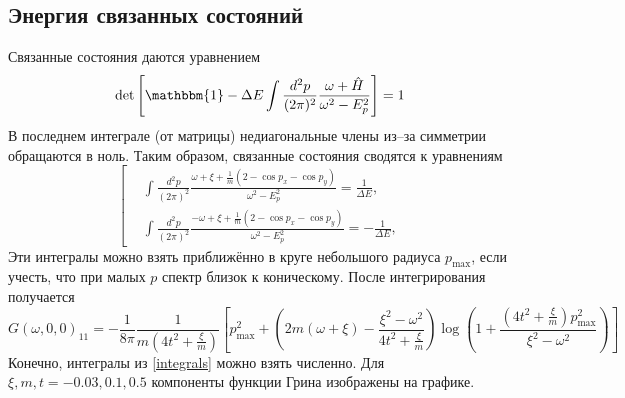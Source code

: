\subsection{Энергия связанных состояний}
Связанные состояния даются уравнением
\begin{equation}    
    \det{\left[\mathbbm{1} - \Delta E \int \frac{d^2 p}{(2\pi)^2} 
            \frac{\omega + \hat{H}}{\omega^2 - E_p^2}\right]} = 1
\end{equation}
В последнем интеграле (от матрицы) недиагональные члены из--за симметрии обращаются в ноль.
Таким образом, связанные состояния сводятся к уравнениям
\begin{equation}
    \label{integrals}
    \left[
    \begin{split}
        &\int \frac{d^2 p}{(2\pi)^2} 
            \frac{\omega + \xi + \frac{1}{m}(2 - \cos{p_x} - \cos{p_y})}
                 {\omega^2 - E_p^2} = \frac{1}{\Delta E},\\
        &\int \frac{d^2 p}{(2\pi)^2} 
            \frac{-\omega + \xi + \frac{1}{m}(2 - \cos{p_x} - \cos{p_y})}
                 {\omega^2 - E_p^2} = -\frac{1}{\Delta E},
    \end{split}
    \right.
\end{equation}
Эти интегралы можно взять приближённо в круге небольшого радиуса $p_{\mathrm{max}}$,
если учесть, что при малых $p$ спектр близок к 
коническому. После интегрирования получается
\begin{equation}
    G(\omega,0,0)_{11} = -\frac{1}{8\pi}\frac{1}{m(4t^2 + \frac{\xi}{m})}
        \left[ p_{\mathrm{max}}^2 + 
            \left(2m(\omega+\xi) - \frac{\xi^2 - \omega^2}{4t^2 + \frac{\xi}{m}}\right) 
                \log{\left(1 + \frac{\left(4t^2 + \frac{\xi}{m}\right)p_{\mathrm{max}}^2}
                                    {\xi^2 - \omega^2}\right)}\right]
\end{equation}
Конечно, интегралы из \eqref{integrals} можно взять численно. Для 
$\xi, m, t = -0.03, 0.1, 0.5$ компоненты функции Грина изображены на графике.

